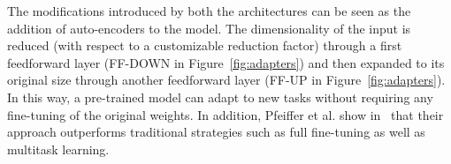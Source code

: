 The modifications introduced by both the architectures can be seen as the addition of auto-encoders to the model. The dimensionality of the input is reduced (with respect to a customizable reduction factor) through a first feedforward layer (FF-DOWN in Figure~\ref{fig:adapters}) and then expanded to its original size through another feedforward layer (FF-UP in Figure~\ref{fig:adapters}). In this way, a pre-trained model can adapt to new tasks without requiring any fine-tuning of the original weights. In addition, Pfeiffer et al. show in~\cite{pfeiffer2021adapterfusion} that their approach outperforms traditional strategies such as full fine-tuning as well as multitask learning.